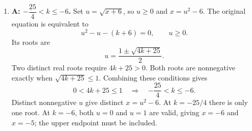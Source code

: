 \documentclass[12pt]{article}
\begin{document}
\begin{enumerate}[leftmargin=*,itemsep=1em]
  \vfill
  \item \textbf{A: $-\dfrac{25}{4}<k\le -6$.} Set $u=\sqrt{x+6}$, so $u\ge0$ and $x=u^2-6$. The original equation is equivalent to
  \[
    u^2-u-(k+6)=0,\qquad u\ge0.
  \]
  Its roots are
  \[
    u=\frac{1\pm\sqrt{4k+25}}{2}.
  \]
  Two distinct real roots require $4k+25>0$. Both roots are nonnegative exactly when $\sqrt{4k+25}\le1$. Combining these conditions gives
  \[
    0<4k+25\le1\quad\Longrightarrow\quad
    \boxed{-\frac{25}{4}<k\le-6}.
  \]
  Distinct nonnegative $u$ give distinct $x=u^2-6$. At $k=-25/4$ there is only one root. At $k=-6$, both $u=0$ and $u=1$ are valid, giving $x=-6$ and $x=-5$; the upper endpoint must be included.
  \vfill
\end{enumerate}
\end{document}

